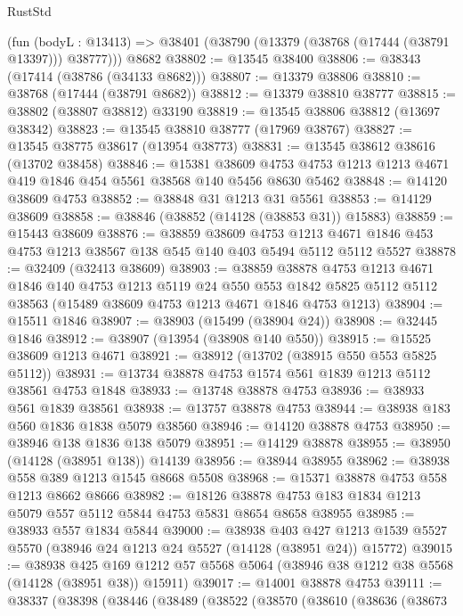 \begin{lexlean}{RustStd}
\begin{coremodule}
    (fun (bodyL : @13413) => @38401 (@38790 (@13379 (@38768 (@17444 (@38791 @13397))) @38777)))
    @8682
@38802 := @13545 @38400
@38806 := @38343 (@17414 (@38786 (@34133 @8682)))
@38807 := @13379 @38806
@38810 := @38768 (@17444 (@38791 @8682))
@38812 := @13379 @38810 @38777
@38815 := @38802 (@38807 @38812) @33190
@38819 := @13545 @38806 @38812 (@13697 @38342)
@38823 := @13545 @38810 @38777 (@17969 @38767)
@38827 := @13545 @38775 @38617 (@13954 @38773)
@38831 := @13545 @38612 @38616 (@13702 @38458)
@38846 := @15381
    @38609
    @4753
    @4753
    @1213
    @1213
    @4671
    @419
    @1846
    @454
    @5561
    @38568
    @140
    @5456
    @8630
    @5462
@38848 := @14120 @38609 @4753
@38852 := @38848 @31 @1213 @31 @5561
@38853 := @14129 @38609
@38858 := @38846 (@38852 (@14128 (@38853 @31)) @15883)
@38859 := @15443 @38609
@38876 := @38859
    @38609
    @4753
    @1213
    @4671
    @1846
    @453
    @4753
    @1213
    @38567
    @138
    @545
    @140
    @403
    @5494
    @5112
    @5112
    @5527
@38878 := @32409 (@32413 @38609)
@38903 := @38859
    @38878
    @4753
    @1213
    @4671
    @1846
    @140
    @4753
    @1213
    @5119
    @24
    @550
    @553
    @1842
    @5825
    @5112
    @5112
    @38563
    (@15489 @38609 @4753 @1213 @4671 @1846 @4753 @1213)
@38904 := @15511 @1846
@38907 := @38903 (@15499 (@38904 @24))
@38908 := @32445 @1846
@38912 := @38907 (@13954 (@38908 @140 @550))
@38915 := @15525 @38609 @1213 @4671
@38921 := @38912 (@13702 (@38915 @550 @553 @5825 @5112))
@38931 := @13734 @38878 @4753 @1574 @561 @1839 @1213 @5112 @38561 @4753 @1848
@38933 := @13748 @38878 @4753
@38936 := @38933 @561 @1839 @38561
@38938 := @13757 @38878 @4753
@38944 := @38938 @183 @560 @1836 @1838 @5079 @38560
@38946 := @14120 @38878 @4753
@38950 := @38946 @138 @1836 @138 @5079
@38951 := @14129 @38878
@38955 := @38950 (@14128 (@38951 @138)) @14139
@38956 := @38944 @38955
@38962 := @38938 @558 @389 @1213 @1545 @8668 @5508
@38968 := @15371 @38878 @4753 @558 @1213 @8662 @8666
@38982 := @18126 @38878 @4753 @183 @1834 @1213 @5079 @557 @5112 @5844 @4753 @5831 @8654 @8658 @38955
@38985 := @38933 @557 @1834 @5844
@39000 := @38938
    @403
    @427
    @1213
    @1539
    @5527
    @5570
    (@38946 @24 @1213 @24 @5527 (@14128 (@38951 @24)) @15772)
@39015 := @38938
    @425
    @169
    @1212
    @57
    @5568
    @5064
    (@38946 @38 @1212 @38 @5568 (@14128 (@38951 @38)) @15911)
@39017 := @14001 @38878 @4753
@39111 := @38337
    (@38398
      (@38446
        (@38489
          (@38522
            (@38570
              (@38610
                (@38636
                  (@38673

\end{coremodule}
\end{lexlean}

